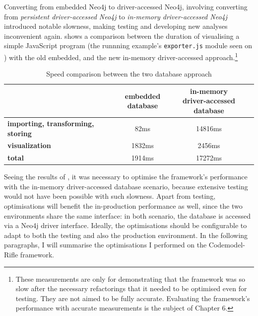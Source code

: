 Converting from embedded Neo4j to driver-accessed Neo4j, involving converting from \emph{persistent driver-accessed Neo4j} to \emph{in-memory driver-accessed Neo4j} introduced notable slowness, making testing and developing new analyses inconvenient again.  shows a comparison between the duration of visualising a simple JavaScript program (the runnning example's \texttt{exporter.js} module seen on ) with the old embedded, and the new in-memory driver-accessed approach.\footnote{These measurements are only for demonstrating that the framework was so slow after the necessary refactorings that it needed to be optimised even for testing. They are not aimed to be fully accurate. Evaluating the framework's performance with accurate measurements is the subject of Chapter 6.}

\begin{table}[!htb]
	\centering
	\begin{tabular}{l|cc}
		\toprule
																								& \shortstack{\textbf{embedded} \\ \textbf{database}}
																								& \shortstack{\textbf{in-memory} \\ \textbf{driver-accessed database}}
																								\\
		\midrule
		\textbf{importing, transforming, storing}   &   82ms     &   14816ms    \\
		\textbf{visualization}                      &   1832ms   &   2456ms    \\
		\midrule
		\textbf{total}                              &   1914ms   &   17272ms   \\
		\bottomrule
	\end{tabular}

	\caption{Speed comparison between the two database approach}
	\label{table:embedded-vs-in-memory-remote-table}
\end{table}

Seeing the results of , it was necessary to optimise the framework's performance with the in-memory driver-accessed database scenario, because extensive testing would not have been possible with such slowness. Apart from testing, optimisations will benefit the in-production performance as well, since the two environments share the same interface: in both scenario, the database is accessed via a Neo4j driver interface. Ideally, the optimisations should be configurable to adapt to both the testing and also the production environment. In the following paragraphs, I will summarise the optimisations I performed on the Codemodel-Rifle framework.

